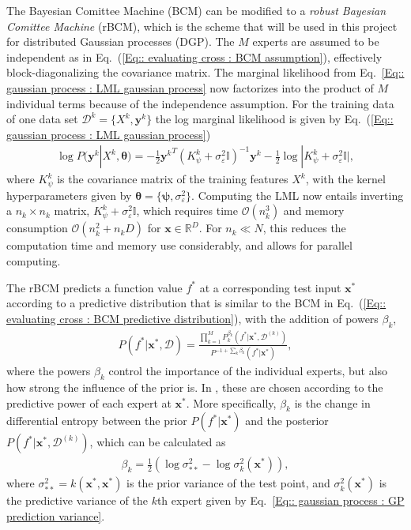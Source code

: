 \documentclass[twoside,english]{uiofysmaster}
\begin{document}
{The Bayesian Comittee Machine (BCM) can be modified to a \textit{robust Bayesian Comittee Machine} (rBCM), which is the scheme that will be used in this project for distributed Gaussian processes (DGP). The $M$ experts are assumed to be independent \cite{deisenroth2015distributed} as in Eq.~(\ref{Eq:: evaluating cross : BCM assumption}), effectively block-diagonalizing the covariance matrix. The marginal likelihood from Eq.~\ref{Eq:: gaussian process : LML gaussian process} now factorizes into the product of $M$ individual terms because of the independence assumption. For the training data of one data set $\mathcal{D}^k = \{X^k, \textbf{y}^k \}$ the log marginal likelihood is given by Eq.~(\ref{Eq:: gaussian process : LML gaussian process})
\begin{align}
\log P(\textbf{y}^k|X^k, \boldsymbol{\theta}) = - \frac{1}{2} {\textbf{y}^k}^T (K_{\psi}^k + \sigma_{\varepsilon}^2 \mathbb{I})^{-1}\textbf{y}^k - \frac{1}{2} \log
 |K_{\psi}^k + \sigma_{\varepsilon}^2 \mathbb{I} |,
\end{align}
where $K_{\psi}^k$ is the covariance matrix of the training features $X^k$, with the kernel hyperparameters given by $\boldsymbol{\theta} = \{ \boldsymbol{\psi}, \sigma_{\varepsilon}^2 \}$. Computing the LML now entails inverting a $n_k \times n_k$ matrix, $K_{\psi}^{k} + \sigma_{\varepsilon}^2 \mathbb{I}$, which requires time $\mathcal{O}(n_k^3)$ and memory consumption $\mathcal{O}(n_k^2 + n_kD)$ for $\textbf{x} \in \mathbb{R}^D$. For $n_k \ll N$, this reduces the computation time and memory use considerably, and allows for parallel computing. 

The rBCM predicts a function value $f^*$ at a corresponding test input $\textbf{x}^*$ according to a predictive distribution that is similar to the BCM in Eq.~(\ref{Eq:: evaluating cross : BCM predictive distribution}), with the addition of powers $\beta_k$,
\begin{align}
P(f^* | \textbf{x}^*, \mathcal{D}) = \frac{\prod_{k=1}^M P_k^{\beta_k} (f^*| \textbf{x}^*, \mathcal{D}^{(k)})}{P^{-1 + \sum_k \beta_k} (f^* | \textbf{x}^*)},
\end{align}
where the powers $\beta_k$ control the importance of the individual experts, but also how strong the influence of the prior is. In \cite{deisenroth2015distributed}, these are chosen according to the predictive power of each expert at $\textbf{x}^*$. More specifically, $\beta_k$ is the change in differential entropy between the prior $P(f^* | \textbf{x}^*)$ and the posterior $P(f^* | \textbf{x}^*, \mathcal{D}^{(k)})$, which can be calculated as 
\begin{align}
\beta_k = \frac{1}{2} (\log \sigma_{**}^2 - \log \sigma^2_k(\textbf{x}^*) ),
\end{align}
where $\sigma_{**}^2 = k(\textbf{x}^*, \textbf{x}^*)$ is the prior variance of the test point, and $\sigma_k^2 (\textbf{x}^*)$ is the predictive variance of the $k$th expert given by Eq.~\ref{Eq:: gaussian process : GP prediction variance}. 

}
\end{document}
